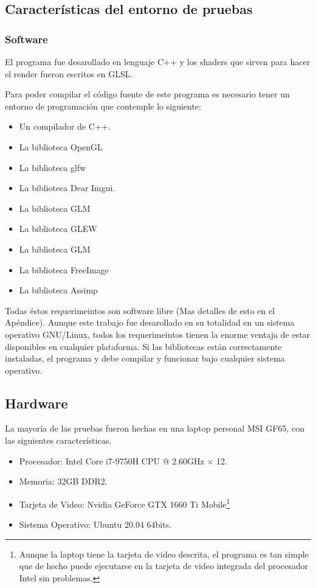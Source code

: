 \subsection{Características del entorno de pruebas}

\subsubsection{Software}

El programa fue desarollado en lenguaje C++ y los shaders que sirven para hacer el render fueron escritos en GLSL.

Para poder compilar el código fuente de este programa es necesario tener un entorno de programación que contemple lo siguiente:

\begin{itemize}
 \item Un compilador de C++.
 \item La biblioteca OpenGL
 \item La biblioteca glfw
 \item La biblioteca Dear Imgui.
 \item La biblioteca GLM
 \item La biblioteca GLEW
 \item La biblioteca GLM
 \item La biblioteca FreeImage
 \item La biblioteca Assimp
\end{itemize}

Todas éstos requerimeintos son software libre (Mas detalles de esto en el Apéndice).
Aunque este trabajo fue desarollado en su totalidad en un sistema operativo GNU/Linux, todos los requerimeintos tienen la enorme ventaja de estar disponibles en cualquier plataforma.
Si las bibliotecas están correctamente instaladas, el programa y debe compilar y funcionar bajo cualquier sistema operativo.

\subsection{Hardware}
La mayoría de las pruebas fueron hechas en una laptop personal MSI GF65, con las siguientes características.

\begin{itemize}
\label{maquina:trabajo} 
 \item Procesador: Intel Core i7-9750H CPU @ 2.60GHz $\times$ 12.
 \item Memoria: 32GB DDR2.
 \item Tarjeta de Video: Nvidia GeForce GTX 1660 Ti Mobile\footnote{Aunque la laptop tiene la tarjeta de video descrita, el programa es tan simple que de hecho puede ejecutarse en la tarjeta de video integrada del procesador Intel sin problemas.}
 \item Sistema Operativo: Ubuntu 20.04 64bits.
\end{itemize}

